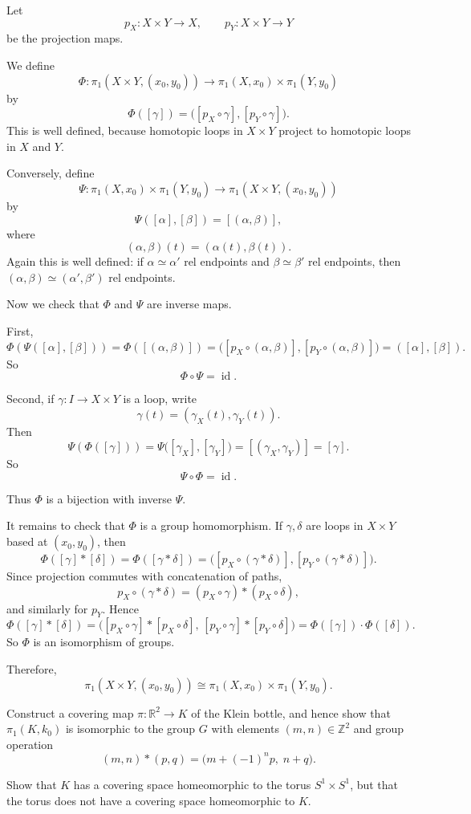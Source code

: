 \begin{solution}
Let
\[
p_X:X\times Y\to X,
\qquad
p_Y:X\times Y\to Y
\]
be the projection maps.

We define
\[
\Phi:\pi_1(X\times Y,(x_0,y_0))
\longrightarrow
\pi_1(X,x_0)\times \pi_1(Y,y_0)
\]
by
\[
\Phi([\gamma])
=
\bigl([p_X\circ \gamma],[p_Y\circ \gamma]\bigr).
\]
This is well defined, because homotopic loops in \(X\times Y\) project to homotopic loops in \(X\) and \(Y\).

Conversely, define
\[
\Psi:\pi_1(X,x_0)\times \pi_1(Y,y_0)
\longrightarrow
\pi_1(X\times Y,(x_0,y_0))
\]
by
\[
\Psi([\alpha],[\beta])=[(\alpha,\beta)],
\]
where
\[
(\alpha,\beta)(t)=(\alpha(t),\beta(t)).
\]
Again this is well defined: if \(\alpha\simeq \alpha'\) rel endpoints and \(\beta\simeq \beta'\) rel endpoints, then \((\alpha,\beta)\simeq(\alpha',\beta')\) rel endpoints.

Now we check that \(\Phi\) and \(\Psi\) are inverse maps.

First,
\[
\Phi(\Psi([\alpha],[\beta]))
=
\Phi([(\alpha,\beta)])
=
\bigl([p_X\circ(\alpha,\beta)],[p_Y\circ(\alpha,\beta)]\bigr)
=
([\alpha],[\beta]).
\]
So
\[
\Phi\circ\Psi=\operatorname{id}.
\]

Second, if \(\gamma:I\to X\times Y\) is a loop, write
\[
\gamma(t)=(\gamma_X(t),\gamma_Y(t)).
\]
Then
\[
\Psi(\Phi([\gamma]))
=
\Psi\bigl([\gamma_X],[\gamma_Y]\bigr)
=
[(\gamma_X,\gamma_Y)]
=
[\gamma].
\]
So
\[
\Psi\circ\Phi=\operatorname{id}.
\]

Thus \(\Phi\) is a bijection with inverse \(\Psi\).

It remains to check that \(\Phi\) is a group homomorphism. If \(\gamma,\delta\) are loops in \(X\times Y\) based at \((x_0,y_0)\), then
\[
\Phi([\gamma]*[\delta])
=
\Phi([\gamma * \delta])
=
\bigl([p_X\circ(\gamma * \delta)],[p_Y\circ(\gamma * \delta)]\bigr).
\]
Since projection commutes with concatenation of paths,
\[
p_X\circ(\gamma * \delta)=(p_X\circ\gamma)*(p_X\circ\delta),
\]
and similarly for \(p_Y\). Hence
\[
\Phi([\gamma]*[\delta])
=
\bigl([p_X\circ\gamma]*[p_X\circ\delta],\,
[p_Y\circ\gamma]*[p_Y\circ\delta]\bigr)
=
\Phi([\gamma])\cdot\Phi([\delta]).
\]
So \(\Phi\) is an isomorphism of groups.

Therefore,
\[
\pi_1(X\times Y,(x_0,y_0))
\cong
\pi_1(X,x_0)\times \pi_1(Y,y_0).
\]
\end{solution}

\begin{problem}
Construct a covering map \(\pi:\mathbb R^2\to K\) of the Klein bottle, and hence show that \(\pi_1(K,k_0)\) is isomorphic to the group \(G\) with elements \((m,n)\in\mathbb Z^2\) and group operation
\[
(m,n)*(p,q)=\bigl(m+(-1)^n p,\; n+q\bigr).
\]

Show that \(K\) has a covering space homeomorphic to the torus \(S^1\times S^1\), but that the torus does not have a covering space homeomorphic to \(K\).
\end{problem}

